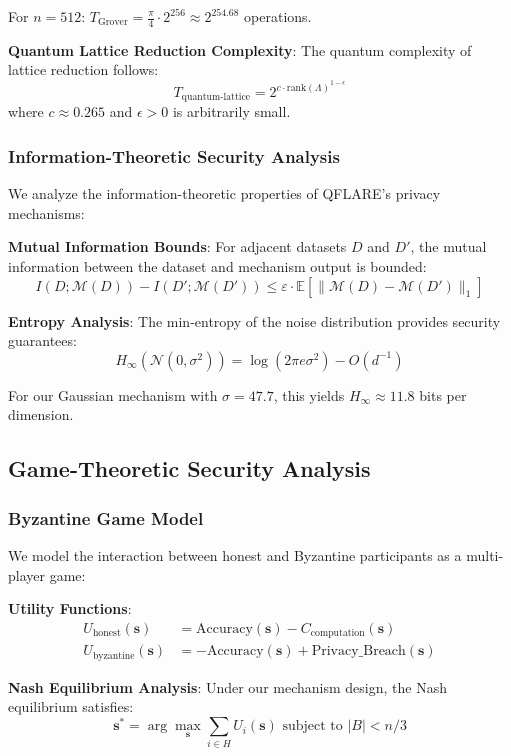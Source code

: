 \documentclass[onecolumn,11pt]{article}
\begin{document}
For $n = 512$: $T_{\text{Grover}} = \frac{\pi}{4} \cdot 2^{256} \approx 2^{254.68}$ operations.

\textbf{Quantum Lattice Reduction Complexity}:
The quantum complexity of lattice reduction follows:
$$T_{\text{quantum-lattice}} = 2^{c \cdot \text{rank}(\Lambda)^{1-\epsilon}}$$
where $c \approx 0.265$ and $\epsilon > 0$ is arbitrarily small.

\subsubsection{Information-Theoretic Security Analysis}

We analyze the information-theoretic properties of QFLARE's privacy mechanisms:

\textbf{Mutual Information Bounds}:
For adjacent datasets $D$ and $D'$, the mutual information between the dataset and mechanism output is bounded:
$$I(D; \mathcal{M}(D)) - I(D'; \mathcal{M}(D')) \leq \varepsilon \cdot \mathbb{E}[\|\mathcal{M}(D) - \mathcal{M}(D')\|_1]$$

\textbf{Entropy Analysis}:
The min-entropy of the noise distribution provides security guarantees:
$$H_\infty(\mathcal{N}(0, \sigma^2)) = \log(2\pi e \sigma^2) - O(d^{-1})$$

For our Gaussian mechanism with $\sigma = 47.7$, this yields $H_\infty \approx 11.8$ bits per dimension.

\subsection{Game-Theoretic Security Analysis}

\subsubsection{Byzantine Game Model}

We model the interaction between honest and Byzantine participants as a multi-player game:

\textbf{Utility Functions}:
\begin{align}
U_{\text{honest}}(\mathbf{s}) &= \text{Accuracy}(\mathbf{s}) - C_{\text{computation}}(\mathbf{s}) \\
U_{\text{byzantine}}(\mathbf{s}) &= -\text{Accuracy}(\mathbf{s}) + \text{Privacy\_Breach}(\mathbf{s})
\end{align}

\textbf{Nash Equilibrium Analysis}:
Under our mechanism design, the Nash equilibrium satisfies:
$$\mathbf{s}^* = \arg\max_{\mathbf{s}} \sum_{i \in H} U_i(\mathbf{s}) \text{ subject to } |B| < n/3$$
\end{document}
